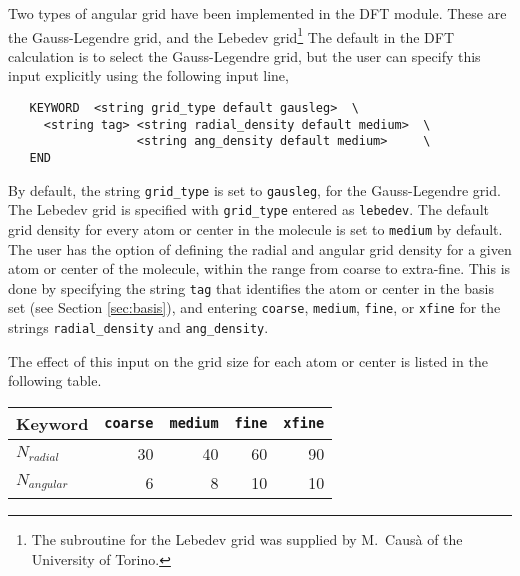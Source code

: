 Two types of angular grid have been implemented in the DFT module.  These
are the Gauss-Legendre grid, and the Lebedev grid\footnote{The subroutine 
for the Lebedev grid was supplied by M.~Caus\`a of the University of Torino.}
The default in the DFT calculation is to select the Gauss-Legendre grid,
but the user can specify this input explicitly using the following input
line,

\begin{verbatim}
   KEYWORD  <string grid_type default gausleg>  \
     <string tag> <string radial_density default medium>  \
                  <string ang_density default medium>     \
   END
\end{verbatim}

By default, the string \verb+grid_type+ is set to \verb+gausleg+, for the
Gauss-Legendre grid.  The Lebedev grid is specified with \verb+grid_type+
entered as \verb+lebedev+.  The default grid density for every atom or
center in the molecule is set to \verb+medium+ by default.  The user has the
option of defining the radial and angular grid density for a given atom 
or center of the molecule, within
the range from coarse to extra-fine.  This is done by specifying the string 
\verb+tag+ that identifies the atom or center in the basis set (see Section
\ref{sec:basis}), and entering \verb+coarse+, \verb+medium+, \verb+fine+,
or \verb+xfine+ for the strings \verb+radial_density+ and \verb+ang_density+.


The effect of this input on the grid size for each atom or center is listed
in the following table.


  \begin{tabular}[right]{|l|r r r r|} \hline
Keyword & {\tt coarse} & {\tt medium} & {\tt fine} & {\tt xfine} \\ \hline
$N_{radial}$ & 30 & 40 & 60 & 90 \\
$N_{angular}$ & 6 & 8 & 10 & 10 \\  \hline
  \end{tabular}

